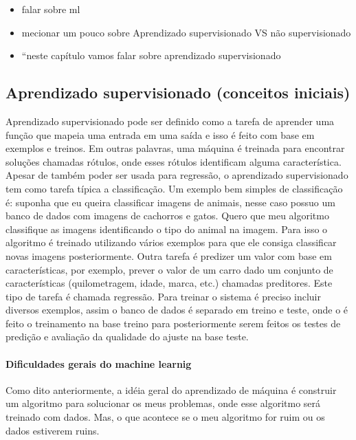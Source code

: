 \documentclass[
  letterpaper,
  DIV=11,
  numbers=noendperiod]{scrreprt}
\let\oldparagraph\paragraph
\renewcommand{\paragraph}[1]{\oldparagraph{#1}\mbox{}}
\begin{document}
\begin{itemize}
\item
  falar sobre ml
\item
  mecionar um pouco sobre Aprendizado supervisionado VS não
  supervisionado
\item
  ``neste capítulo vamos falar sobre aprendizado supervisionado
\end{itemize}

\hypertarget{aprendizado-supervisionado-conceitos-iniciais}{%
\subsection{Aprendizado supervisionado (conceitos
iniciais)}\label{aprendizado-supervisionado-conceitos-iniciais}}

Aprendizado supervisionado pode ser definido como a tarefa de aprender
uma função que mapeia uma entrada em uma saída e isso é feito com base
em exemplos e treinos. Em outras palavras, uma máquina é treinada para
encontrar soluções chamadas rótulos, onde esses rótulos identificam
alguma característica. Apesar de também poder ser usada para regressão,
o aprendizado supervisionado tem como tarefa típica a classificação. Um
exemplo bem simples de classificação é: suponha que eu queira
classificar imagens de animais, nesse caso possuo um banco de dados com
imagens de cachorros e gatos. Quero que meu algoritmo classifique as
imagens identificando o tipo do animal na imagem. Para isso o algoritmo
é treinado utilizando vários exemplos para que ele consiga classificar
novas imagens posteriormente. Outra tarefa é predizer um valor com base
em características, por exemplo, prever o valor de um carro dado um
conjunto de características (quilometragem, idade, marca, etc.) chamadas
preditores. Este tipo de tarefa é chamada regressão. Para treinar o
sistema é preciso incluir diversos exemplos, assim o banco de dados é
separado em treino e teste, onde o é feito o treinamento na base treino
para posteriormente serem feitos os testes de predição e avaliação da
qualidade do ajuste na base teste.

\hypertarget{dificuldades-gerais-do-machine-learnig}{%
\paragraph{Dificuldades gerais do machine
learnig}\label{dificuldades-gerais-do-machine-learnig}}

Como dito anteriormente, a idéia geral do aprendizado de máquina é
construir um algoritmo para solucionar os meus problemas, onde esse
algoritmo será treinado com dados. Mas, o que acontece se o meu
algoritmo for ruim ou os dados estiverem ruins.
\end{document}
